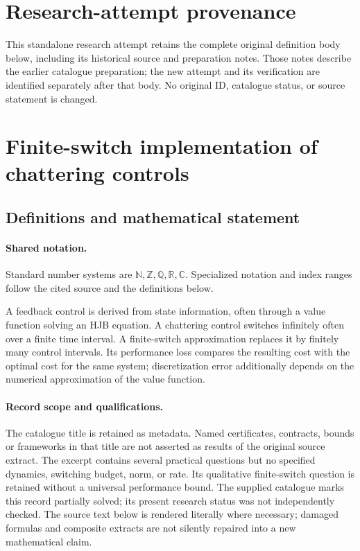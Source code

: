 \documentclass[11pt]{article}
\begin{document}
\section*{Research-attempt provenance}
This standalone research attempt retains the complete original definition body below,
including its historical source and preparation notes. Those notes describe the
earlier catalogue preparation; the new attempt and its verification are identified
separately after that body. No original ID, catalogue status, or source statement is changed.

\section{Finite-switch implementation of chattering controls}\label{statement}

\subsection{Definitions and mathematical statement}

\paragraph{Shared notation.}Standard number systems are $\mathbb N,\mathbb Z,\mathbb Q,\mathbb R,\mathbb C$. Specialized notation and index ranges follow the cited source and the definitions below.


A feedback control is derived from state information, often through a value function solving an HJB equation. A chattering control switches infinitely often over a finite time interval. A finite-switch approximation replaces it by finitely many control intervals. Its performance loss compares the resulting cost with the optimal cost for the same system; discretization error additionally depends on the numerical approximation of the value function.
\paragraph{Record scope and qualifications.}
The catalogue title is retained as metadata. Named certificates, contracts, bounds or frameworks in that title are not asserted as results of the original source extract.
The excerpt contains several practical questions but no specified dynamics, switching budget, norm, or rate. Its qualitative finite-switch question is retained without a universal performance bound. The supplied catalogue marks this record partially solved; its present research status was not independently checked.
The source text below is rendered literally where necessary; damaged formulas and composite extracts are not silently repaired into a new mathematical claim.
\end{document}
